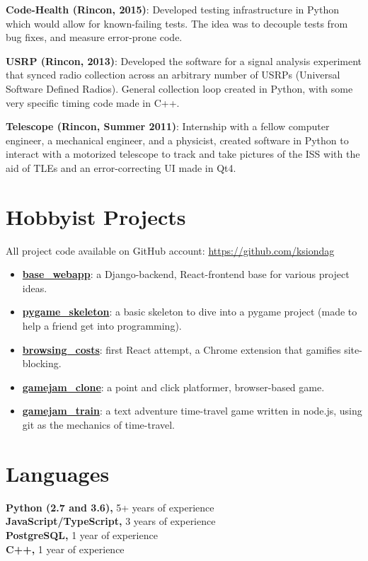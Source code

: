 \documentclass{res}
\begin{document}
\begin{resume}
  {\bf Code-Health (Rincon, 2015)}: Developed  testing infrastructure in Python which would allow for 
  known-failing tests. The idea was to decouple tests from bug fixes, and measure error-prone code.

  {\bf USRP (Rincon, 2013)}: Developed the software for a signal analysis experiment that synced radio collection across
  an arbitrary number of USRPs (Universal Software Defined Radios). General collection loop created in Python,
  with some very specific timing code made in C++.

  {\bf Telescope (Rincon, Summer 2011)}: Internship with a fellow computer engineer, a mechanical engineer, and a
  physicist, created software in Python to interact with a motorized telescope to track
  and take pictures of the ISS with the aid of TLEs and an error-correcting UI made in Qt4.
\vspace{0.1in}
    
 
\section{Hobbyist Projects}
All project code available on GitHub account: \url{https://github.com/ksiondag}
  \begin{itemize}
    \item[] {\bf \href{https://github.com/ksiondag/base_webapp}{base\_webapp}}: a Django-backend, React-frontend
    base for various project ideas.
    \item[] {\bf \href{https://github.com/ksiondag/pygame_skeleton}{pygame\_skeleton}}: a basic skeleton to dive
    into a pygame project (made to help a friend get into programming).
    \item[] {\bf \href{https://github.com/ksiondag/browsing_costs}{browsing\_costs}}: first React attempt, a
    Chrome extension that gamifies site-blocking.
    \item[] {\bf \href{https://github.com/ksiondag/gamejam_clone}{gamejam\_clone}}: a point and click platformer,
    browser-based game.
    \item[] {\bf \href{https://github.com/ksiondag/gamejam_train}{gamejam\_train}}: a text adventure time-travel
    game written in node.js, using git as the mechanics of time-travel.
  \end{itemize}
\vspace{0.1in}

  
\section{Languages} 
\vspace{0.1in}
  {\bf Python (2.7 and 3.6),} 5+ years of experience\\
  {\bf JavaScript/TypeScript,} 3 years of experience\\
  {\bf PostgreSQL,} 1 year of experience\\
  {\bf C++,} 1 year of experience
  

\end{resume}
\end{document}
